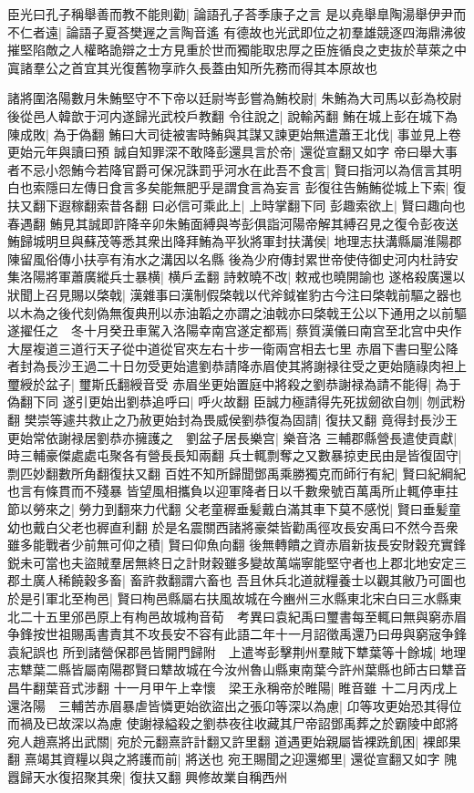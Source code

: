 臣光曰孔子稱舉善而教不能則勸|{
	論語孔子荅季康子之言}
是以堯舉臯陶湯舉伊尹而不仁者遠|{
	論語子夏荅樊遟之言陶音遙}
有德故也光武即位之初羣雄競逐四海鼎沸彼摧堅陷敵之人權略詭辯之士方見重於世而獨能取忠厚之臣旌循良之吏抜於草萊之中寘諸羣公之首宜其光復舊物享祚久長蓋由知所先務而得其本原故也

諸將圍洛陽數月朱鮪堅守不下帝以廷尉岑彭嘗為鮪校尉|{
	朱鮪為大司馬以彭為校尉後從邑人韓歆于河内遂歸光武校戶教翻}
令往說之|{
	說輸芮翻}
鮪在城上彭在城下為陳成敗|{
	為于偽翻}
鮪曰大司徒被害時鮪與其謀又諫更始無遣蕭王北伐|{
	事並見上卷更始元年與讀曰預}
誠自知罪深不敢降彭還具言於帝|{
	還從宣翻又如字}
帝曰舉大事者不忌小怨鮪今若降官爵可保况誅罰乎河水在此吾不食言|{
	賢曰指河以為信言其明白也索隱曰左傳日食言多矣能無肥乎是謂食言為妄言}
彭復往告鮪鮪從城上下索|{
	復扶又翻下遐稼翻索昔各翻}
曰必信可乘此上|{
	上時掌翻下同}
彭趣索欲上|{
	賢曰趣向也春遇翻}
鮪見其誠即許降辛卯朱鮪面縛與岑彭俱詣河陽帝解其縛召見之復令彭夜送鮪歸城明旦與蘇茂等悉其衆出降拜鮪為平狄將軍封扶溝侯|{
	地理志扶溝縣屬淮陽郡陳留風俗傳小扶亭有洧水之溝因以名縣}
後為少府傳封累世帝使侍御史河内杜詩安集洛陽將軍蕭廣縱兵士暴横|{
	横戶孟翻}
詩敕曉不改|{
	敕戒也曉開諭也}
遂格殺廣還以狀聞上召見賜以棨戟|{
	漢雜事曰漢制假棨戟以代斧鉞崔豹古今注曰棨戟前驅之器也以木為之後代刻偽無復典刑以赤油韜之亦謂之油戟亦曰棨戟王公以下通用之以前驅}
遂擢任之　冬十月癸丑車駕入洛陽幸南宫遂定都焉|{
	蔡質漢儀曰南宫至北宫中央作大屋複道三道行天子從中道從官夾左右十步一衛兩宫相去七里}
赤眉下書曰聖公降者封為長沙王過二十日勿受更始遣劉恭請降赤眉使其將謝禄往受之更始隨祿肉袒上璽綬於盆子|{
	璽斯氏翻綬音受}
赤眉坐更始置庭中將殺之劉恭謝禄為請不能得|{
	為于偽翻下同}
遂引更始出劉恭追呼曰|{
	呼火故翻}
臣誠力極請得先死拔劒欲自刎|{
	刎武粉翻}
樊崇等遽共救止之乃赦更始封為畏威侯劉恭復為固請|{
	復扶又翻}
竟得封長沙王更始常依謝禄居劉恭亦擁護之　劉盆子居長樂宫|{
	樂音洛}
三輔郡縣營長遣使貢獻|{
	時三輔豪傑處處屯聚各有營長長知兩翻}
兵士輒剽奪之又數暴掠吏民由是皆復固守|{
	剽匹妙翻數所角翻復扶又翻}
百姓不知所歸聞鄧禹乘勝獨克而師行有紀|{
	賢曰紀綱紀也言有條貫而不殘暴}
皆望風相攜負以迎軍降者日以千數衆號百萬禹所止輒停車拄節以勞來之|{
	勞力到翻來力代翻}
父老童稺垂髪戴白滿其車下莫不感悦|{
	賢曰垂髪童幼也戴白父老也稺直利翻}
於是名震關西諸將豪桀皆勸禹徑攻長安禹曰不然今吾衆雖多能戰者少前無可仰之積|{
	賢曰仰魚向翻}
後無轉饋之資赤眉新抜長安財穀充實鋒鋭未可當也夫盜賊羣居無終日之計財穀雖多變故萬端寧能堅守者也上郡北地安定三郡土廣人稀饒穀多畜|{
	畜許救翻謂六畜也}
吾且休兵北道就糧養士以觀其敝乃可圖也於是引軍北至栒邑|{
	賢曰栒邑縣屬右扶風故城在今豳州三水縣東北宋白曰三水縣東北二十五里邠邑原上有栒邑故城栒音荀　考異曰袁紀禹曰璽書每至輒曰無與窮赤眉争鋒按世祖賜禹書責其不攻長安不容有此語二年十一月詔徵禹還乃曰毋與窮宼争鋒袁紀誤也}
所到諸營保郡邑皆開門歸附　上遣岑彭擊荆州羣賊下犨葉等十餘城|{
	地理志犨葉二縣皆屬南陽郡賢曰犨故城在今汝州魯山縣東南葉今許州葉縣也師古曰犨音昌牛翻葉音式涉翻}
十一月甲午上幸懷　梁王永稱帝於睢陽|{
	睢音雖}
十二月丙戌上還洛陽　三輔苦赤眉暴虐皆憐更始欲盜出之張卬等深以為慮|{
	卬等攻更始恐其得位而禍及已故深以為慮}
使謝禄縊殺之劉恭夜往收藏其尸帝詔鄧禹葬之於霸陵中郎將宛人趙熹將出武關|{
	宛於元翻熹許計翻又許里翻}
道遇更始親屬皆裸跣飢困|{
	裸郎果翻}
熹竭其資糧以與之將護而前|{
	將送也}
宛王賜聞之迎還鄉里|{
	還從宣翻又如字}
隗囂歸天水復招聚其衆|{
	復扶又翻}
興修故業自稱西州

